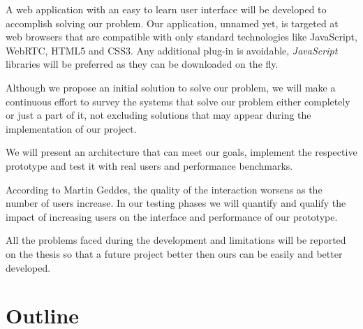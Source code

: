 
A web application with an easy to learn user interface will be developed to accomplish solving our problem. Our application, unnamed yet, is targeted at web browsers that are compatible with only standard technologies like JavaScript, \ac{WebRTC}, \ac{HTML}5 and \ac{CSS}3. Any additional plug-in is avoidable, \emph{JavaScript} libraries will be preferred as they can be downloaded on the fly.


	Although we propose an initial solution to solve our problem, we will make a continuous effort to survey the systems that solve our problem either completely or just a part of it, not excluding solutions that may appear during the implementation of our project.

	We will present an architecture that can meet our goals, implement the respective prototype and test it with real users and performance benchmarks.

        
	According to Martin Geddes, the quality of the interaction worsens as the number of users increase\cite{geddes}. In our testing phases we will quantify and qualify the impact of increasing users on the interface and performance of our prototype. 

	All the problems faced during the development and limitations will be reported on the thesis so that a future project better then ours can be easily and better developed.


\section{Outline}

